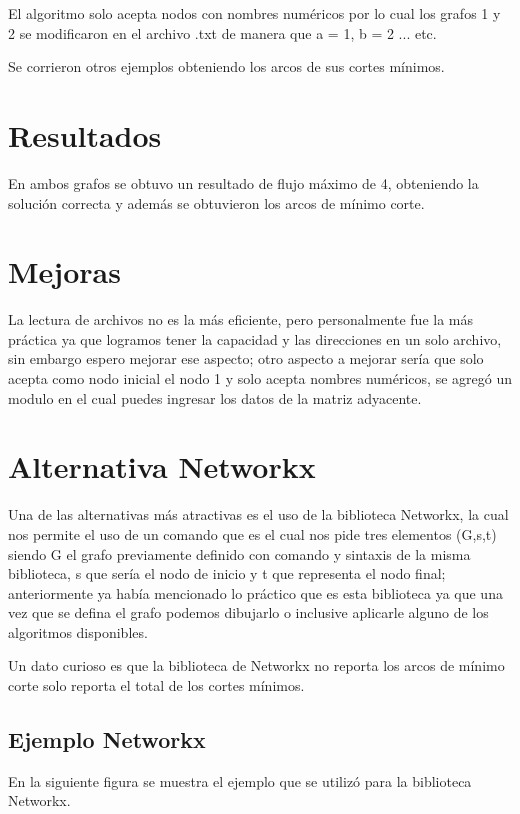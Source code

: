 \documentclass{report}
\begin{document}
El algoritmo solo acepta nodos con nombres numéricos por lo cual los grafos 1 y 2 se modificaron en el archivo .txt de manera que a = 1, b = 2 ... etc.

Se corrieron otros ejemplos obteniendo los arcos de sus cortes mínimos.

\section{Resultados}
En ambos grafos se obtuvo un resultado de flujo máximo de 4, obteniendo la solución correcta y además se obtuvieron los arcos de mínimo corte.

\section{Mejoras}
La lectura de archivos no es la más eficiente, pero personalmente fue la más práctica ya que logramos tener la capacidad y las direcciones en un solo archivo, sin embargo espero mejorar ese aspecto; otro aspecto a mejorar sería que solo acepta como nodo inicial el nodo 1 y solo acepta nombres numéricos, se agregó un modulo en el cual puedes ingresar los datos de la matriz adyacente.

\section{Alternativa Networkx}
Una de las alternativas más atractivas es el uso de la biblioteca Networkx, la cual nos permite el uso de un comando que es \textit{} el cual nos pide tres elementos (G,s,t) siendo G el grafo previamente definido con comando y sintaxis de la misma biblioteca, s que sería el nodo de inicio y t que representa el nodo final; anteriormente ya había mencionado lo práctico que es esta biblioteca ya que una vez que se defina el grafo podemos dibujarlo o inclusive aplicarle alguno de los algoritmos disponibles.

Un dato curioso es que la biblioteca de Networkx no reporta los arcos de mínimo corte solo reporta el total de los cortes mínimos.

\subsection{Ejemplo Networkx}
En la siguiente figura se muestra el ejemplo que se utilizó para la biblioteca Networkx.
\end{document}
